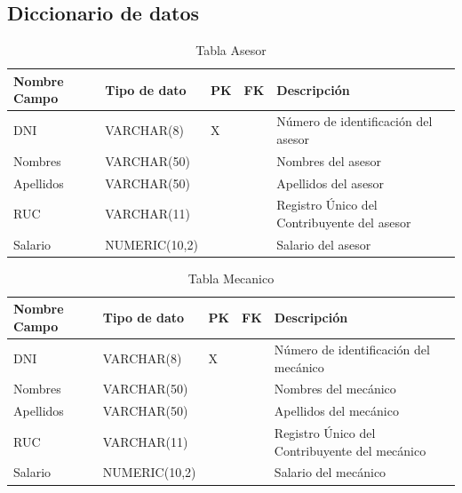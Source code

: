 \documentclass[12pt]{article}
\begin{document}
\newpage

\subsection{Diccionario de datos}

\begin{table}[htbp]
    \begin{center}
    \begin{tabular}{|p{3cm}|p{3cm}|p{1cm}|p{1cm}|p{6cm}|}
        \hline
        Nombre Campo & Tipo de dato & PK & FK & Descripción \\
        \hline
        DNI & VARCHAR(8) & X &  & Número de identificación del asesor \\
        Nombres & VARCHAR(50) &  &  & Nombres del asesor \\
        Apellidos & VARCHAR(50) &  &  & Apellidos del asesor \\
        RUC & VARCHAR(11) &  &  & Registro Único del Contribuyente del asesor \\
        Salario & NUMERIC(10,2) &  &  & Salario del asesor \\
        \hline
        \end{tabular}
        \caption{Tabla Asesor}
    \end{center}
\end{table}


\begin{table}[htbp]
    \begin{center}
        \begin{tabular}{|p{3cm}|p{3cm}|p{1cm}|p{1cm}|p{6cm}|}
            \hline
            Nombre Campo & Tipo de dato & PK & FK & Descripción \\
            \hline
            DNI & VARCHAR(8) & X &  & Número de identificación del mecánico \\
            Nombres & VARCHAR(50) &  &  & Nombres del mecánico \\
            Apellidos & VARCHAR(50) &  &  & Apellidos del mecánico \\
            RUC & VARCHAR(11) &  &  & Registro Único del Contribuyente del mecánico \\
            Salario & NUMERIC(10,2) &  &  & Salario del mecánico \\
            \hline
            \end{tabular}
        \caption{Tabla Mecanico}
    \end{center}
\end{table}
\end{document}
